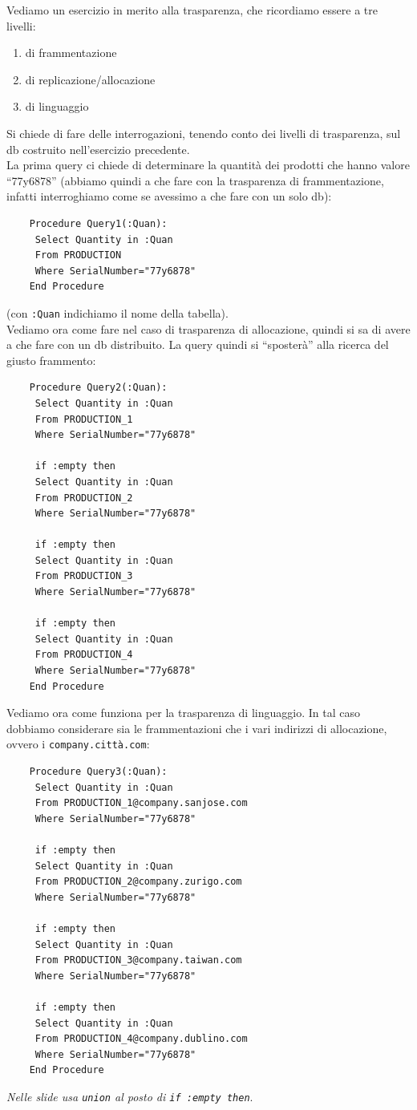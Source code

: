 \documentclass[a4paper,12pt, oneside]{book}
\begin{document}
\begin{esercizio}
  Vediamo un esercizio in merito alla trasparenza, che ricordiamo essere a tre
  livelli:
  \begin{enumerate}
    \item di frammentazione
    \item di replicazione/allocazione
    \item di linguaggio
  \end{enumerate}
  Si chiede di fare delle interrogazioni, tenendo conto dei livelli di
  trasparenza, sul db costruito nell'esercizio precedente.\\
  La prima query ci chiede di determinare la quantità dei prodotti che hanno
  valore ``77y6878'' (abbiamo quindi a che fare con la trasparenza di
  frammentazione, infatti interroghiamo come se avessimo a che fare con un solo
  db): 
  \begin{verbatim}
    Procedure Query1(:Quan):
     Select Quantity in :Quan
     From PRODUCTION
     Where SerialNumber="77y6878"
    End Procedure
  \end{verbatim}
  (con \texttt{:Quan} indichiamo il nome della tabella).\\
  Vediamo ora come fare nel caso di trasparenza di allocazione, quindi si sa di
  avere a che fare con un db distribuito. La query quindi si ``sposterà'' alla
  ricerca del giusto frammento:
  \begin{verbatim}
    Procedure Query2(:Quan):
     Select Quantity in :Quan
     From PRODUCTION_1
     Where SerialNumber="77y6878"
     
     if :empty then
     Select Quantity in :Quan
     From PRODUCTION_2
     Where SerialNumber="77y6878"
     
     if :empty then
     Select Quantity in :Quan
     From PRODUCTION_3
     Where SerialNumber="77y6878"
     
     if :empty then
     Select Quantity in :Quan
     From PRODUCTION_4
     Where SerialNumber="77y6878"
    End Procedure
  \end{verbatim}
  Vediamo ora come funziona per la trasparenza di linguaggio. In tal caso
  dobbiamo considerare sia le frammentazioni che i vari indirizzi di
  allocazione, ovvero i \texttt{company.città.com}:
  \begin{verbatim}
    Procedure Query3(:Quan):
     Select Quantity in :Quan
     From PRODUCTION_1@company.sanjose.com
     Where SerialNumber="77y6878"
     
     if :empty then
     Select Quantity in :Quan
     From PRODUCTION_2@company.zurigo.com
     Where SerialNumber="77y6878"
     
     if :empty then
     Select Quantity in :Quan
     From PRODUCTION_3@company.taiwan.com
     Where SerialNumber="77y6878"
     
     if :empty then
     Select Quantity in :Quan
     From PRODUCTION_4@company.dublino.com
     Where SerialNumber="77y6878"
    End Procedure
  \end{verbatim}
  \textit{Nelle slide usa \texttt{union} al posto di \texttt{if :empty then}}.
\end{esercizio}
\end{document}

